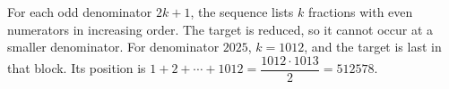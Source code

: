 For each odd denominator $2k+1$, the sequence lists $k$ fractions with even numerators in increasing order. The target is reduced, so it cannot occur at a smaller denominator. For denominator $2025$, $k=1012$, and the target is last in that block. Its position is $1+2+\cdots+1012=\dfrac{1012\cdot1013}{2}=\boxed{512578}$.
